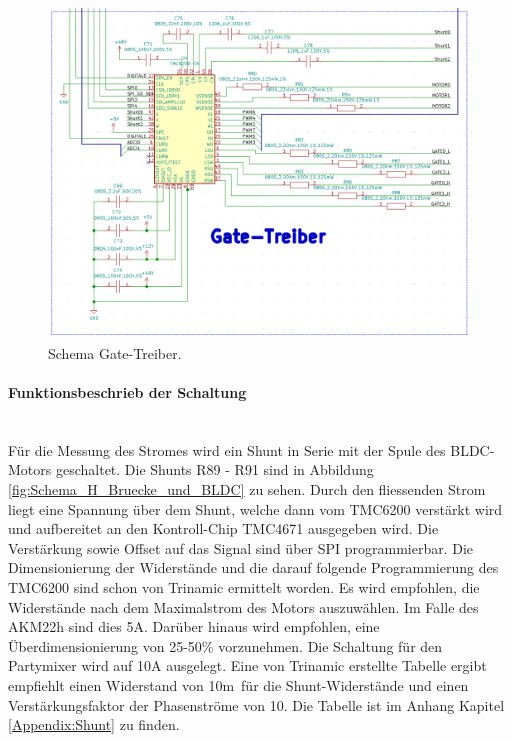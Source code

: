 \begin{figure}[H]
	\centering
	\includegraphics[width=\textwidth]{graphics/Schema_Gate_Treiber}
	\caption{Schema Gate-Treiber.}
	\label{fig:Schema_Gate_Treiber}
\end{figure}


\paragraph{Funktionsbeschrieb der Schaltung}\mbox{}\\

Für die Messung des Stromes wird ein Shunt in Serie mit der Spule des BLDC-Motors geschaltet. Die Shunts R89 - R91 sind in Abbildung \ref{fig:Schema_H_Bruecke_und_BLDC} zu sehen. Durch den fliessenden Strom liegt eine Spannung über dem Shunt, welche dann vom TMC6200 verstärkt wird und aufbereitet an den Kontroll-Chip TMC4671 ausgegeben wird. Die Verstärkung sowie Offset auf das Signal sind über SPI programmierbar.
Die Dimensionierung der Widerstände und die darauf folgende Programmierung des TMC6200 sind schon von Trinamic ermittelt worden. Es wird empfohlen, die Widerstände nach dem Maximalstrom des Motors auszuwählen. Im Falle des AKM22h sind dies 5A. Darüber hinaus wird empfohlen, eine Überdimensionierung von 25-50\% vorzunehmen. Die Schaltung für den Partymixer wird auf 10A ausgelegt. Eine von Trinamic erstellte Tabelle  ergibt empfiehlt einen Widerstand von 10m\textOmega\ für die Shunt-Widerstände und einen Verstärkungsfaktor der Phasenströme von 10. Die Tabelle ist im Anhang Kapitel \ref{Appendix:Shunt} zu finden. \cite[S.31]{trinamicmotion_control_gmbh__co_kg_tmc6200_2019}

